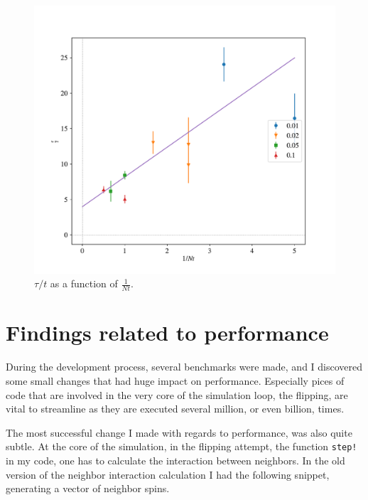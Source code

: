 \documentclass{article}
\begin{document}
\begin{figure}[ht]
  \centering
  \includegraphics[width=.75\textwidth]{media/tau_TN}
  \caption{$\tau/t$ as a function of $\frac{1}{N t}$.\label{fig:tau_TN}}
\end{figure}


\section{Findings related to performance\label{sec:performance}}
During the development process, several benchmarks were made, and I discovered some small changes that had huge impact on performance.
Especially pices of code that are involved in the very core of the simulation loop, the flipping, are vital to streamline as they are executed several million, or even billion, times.

The most successful change I made with regards to performance, was also quite subtle.
At the core of the simulation, in the flipping attempt, the function \verb|step!| in my code, one has to calculate the interaction between neighbors.
In the old version of the neighbor interaction calculation I had the following snippet, generating a vector of neighbor spins.
\end{document}
